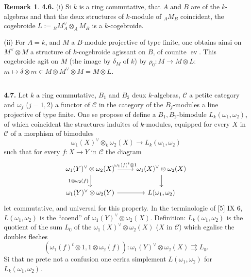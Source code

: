 \documentclass[12pt,a4paper]{article}
\theoremstyle{plain}
\theoremstyle{definition}
\newtheorem{remark}[theorem]{Remark}
\theoremstyle{remark}
\DeclareMathOperator{\ev}{ev}
\begin{document}
\begin{remark}
\textbf{4.6.} (i) Si $k$ is a ring commutative, that $A$ and $B$ are of the $k$-algebras and that the deux structures of $k$-module of ${}_A M_B$ coincident, the cogebroide $L := {}_B M_A^\vee \otimes_A M_B$ is a $k$-cogebroide.

(ii) For $A = k$, and $M$ a $B$-module projective of type finite, one obtains ainsi on $M^\vee \otimes M$ a structure of $k$-cogebroide agissant on $B$, of counite $\ev$. This cogebroide agit on $M$ (the image by $\delta_M$ of $k$) by $\rho_0 : M \to M \otimes L$: $m \mapsto \delta \otimes m \in M \otimes M^\vee \otimes M = M \otimes L$.
\end{remark}

\subsection{}

\textbf{4.7.} Let $k$ a ring commutative, $B_1$ and $B_2$ deux $k$-algebras, $\mathcal{C}$ a petite category and $\omega_j$ ($j = 1,2$) a functor of $\mathcal{C}$ in the category of the $B_j$-modules a line projective of type finite. One se propose of define a $B_1,B_2$-bimodule $L_k(\omega_1,\omega_2)$, of which coincident the structures induites of $k$-modules, equipped for every $X$ in $\mathcal{C}$ of a morphism of bimodules
\begin{equation}\label{eq:4.7.1}
\omega_1(X)^\vee \otimes_k \omega_2(X) \longrightarrow L_k(\omega_1,\omega_2)
\end{equation}
such that for every $f : X \to Y$ in $\mathcal{C}$ the diagram
\begin{equation}\label{eq:4.7.2}
\begin{tikzcd}
\omega_1(Y)^\vee \otimes \omega_2(X) \arrow[r, "{\omega_1(f)^t \otimes 1}"] \arrow[d, "1 \otimes \omega_2(f)"'] & \omega_1(X)^\vee \otimes \omega_2(X) \arrow[d] \\
\omega_1(Y)^\vee \otimes \omega_2(Y) \arrow[r] & L(\omega_1,\omega_2)
\end{tikzcd}
\end{equation}
let commutative, and universal for this property. In the terminologie of [5] IX 6, $L(\omega_1,\omega_2)$ is the ``coend'' of $\omega_1(Y)^\vee \otimes \omega_2(X)$. Definition: $L_k(\omega_1,\omega_2)$ is the quotient of the sum $L_0$ of the $\omega_1(X)^\vee \otimes \omega_2(X)$ ($X$ in $\mathcal{C}$) which egalise the doubles fleches
\[
(\omega_1(f)^t \otimes 1, 1 \otimes \omega_2(f)) : \omega_1(Y)^\vee \otimes \omega_2(X) \rightrightarrows L_0.
\]
Si that ne prete not a confusion one ecrira simplement $L(\omega_1,\omega_2)$ for $L_k(\omega_1,\omega_2)$.
\end{document}
